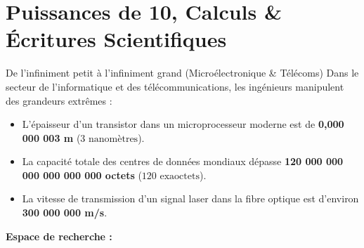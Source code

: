 \chapter{Puissances de 10, Calculs \& Écritures Scientifiques}

\begin{activite}{De l'infiniment petit à l'infiniment grand (Microélectronique \& Télécoms)}
Dans le secteur de l'informatique et des télécommunications, les ingénieurs manipulent des grandeurs extrêmes :
\begin{itemize}
    \item L'épaisseur d'un transistor dans un microprocesseur moderne est de \textbf{0{,}000 000 003 m} ($3\text{ nanomètres}$).
    \item La capacité totale des centres de données mondiaux dépasse \textbf{120 000 000 000 000 000 000 octets} ($120\text{ exaoctets}$).
    \item La vitesse de transmission d'un signal laser dans la fibre optique est d'environ \textbf{300 000 000 m/s}.
\end{itemize}

\begin{center}
\end{center}

\vspace{1mm}
\noindent\textbf{Espace de recherche :}
\lignesreponse[4]
\end{activite}

